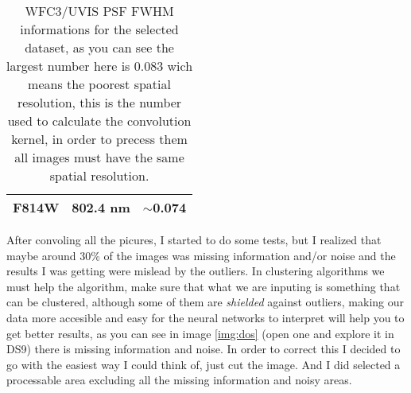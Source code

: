 \documentclass[11pt,fleqn]{book} %
\begin{document}
\begin{table}[h]
\begin{tabular}{ c c c }
																																																																																																																																																																																														          F814W & 802.4 nm & $\sim$0.074\\
																																																																																																																																																																																															      
																																																																																																																																																																																															          \hline
																																																																																																																																																																																																    \end{tabular}
																																																																																																																																																																																																      \caption{WFC3/UVIS PSF FWHM informations for the selected dataset, as you can see the largest number here is 0.083 wich means the poorest spatial resolution, this is the number used to calculate the convolution kernel, in order to precess them all images must have the same spatial resolution.}
																																																																																																																																																																																																        \label{tab:dos}
																																																																																																																																																																																																	\end{table}

																																																																																																																																																																																																	After convoling all the picures, I started to do some tests, but I realized that maybe around 30\% of the images was missing information and/or noise and the results I was getting were mislead by the outliers. In clustering algorithms we must help the algorithm, make sure that what we are inputing is something that can be clustered, although some of them are \emph{shielded} against outliers, making our data more accesible and easy for the neural networks to interpret will help you to get better results, as you can see in image \ref{img:dos} (open one and explore it in DS9) there is missing information and noise. In order to correct this I decided to go with the easiest way I could think of, just cut the image. And I did selected a processable area excluding all the missing information and noisy areas.
\end{document}
